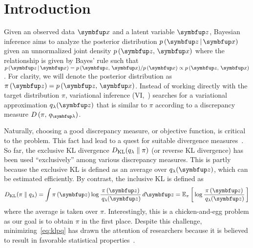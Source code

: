 
\section{Introduction}
Given an observed data \(\vx\) and a latent variable \(\vz\), Bayesian inference aims to analyze the posterior distribution \(p\,(\vz\,|\,\vx)\) given an unnormalized joint density \(p\,(\vz,\,\vx)\) where the relationship is given by Bayes' rule such that \(p\,(\vz\,|\,\vx) = {p\,(\vz,\,\vx)}/{p\,(\vx)} \propto p\,(\vz,\,\vx)\).
For clarity, we will denote the posterior distribution as \(\pi\left(\vz\right) = p\,(\vz,\,\vx)\).
Instead of working directly with the target distribution \(\pi\), variational inference (VI,~\citealt{jordan_introduction_1999, blei_variational_2017, zhang_advances_2019}) searches for a variational approximation \(q_{\lambda}(\vz)\) that is similar to \(\pi\) according to a discrepancy measure \(D\,(\pi,\, q_{\vlambda})\).

Naturally, choosing a good discrepancy measure, or objective function, is critical to the problem.
This fact had lead to a quest for suitable divergence measures~\citep{pmlr-v37-salimans15, NIPS2016_7750ca35, NIPS2017_35464c84, NEURIPS2018_1cd138d0, pmlr-v97-ruiz19a}.
So far, the exclusive KL divergence \(D_{\mathrm{KL}}(q_{\lambda}\parallel\pi)\) (or reverse KL divergence) has been used ``exclusively'' among various discrepancy measures.
This is partly because the exclusive KL is defined as an average over \(q_{\lambda}(\vz)\), which can be estimated efficiently.
By contrast, the inclusive KL is defined as
%
{\small
\begin{align}
  \DKL{\pi}{q_{\lambda}}
  = \int \pi\,(\vz) \log \frac{\pi\left(\vz\right)}{\,q_{\lambda}(\vz)} \,d\vz
  = \Esub{\pi}{\log \frac{\pi\left(\vz\right)}{\,q_{\lambda}(\vz)} } \label{eq:klpq}
\end{align}
}%
%
where the average is taken over \(\pi\). 
Interestingly, this is a chicken-and-egg problem as our goal is to obtain \(\pi\) in the first place.
Despite this challenge, minimizing~\eqref{eq:klpq} has drawn the attention of researchers because it is believed to result in favorable statistical properties~\citep{minka2005divergence, mackay_local_2001}.

